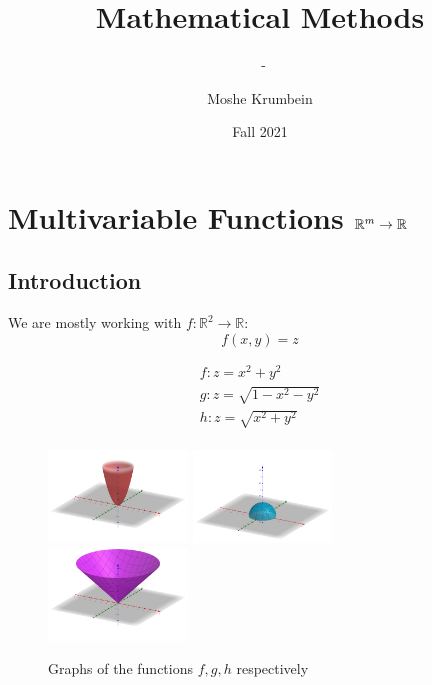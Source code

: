 \documentclass[00_complete]{subfiles}
\title{Mathematical Methods}
\author{Moshe Krumbein}
\date{Fall 2021}
\begin{document}
\setcounter{chapter}{9}

\chapter{Multivariable Functions \texorpdfstring{$\mathbb{R}^{\lowercase{m}} \to \mathbb{R}$}{Rm to R}}
\subtitle{\theauthor~- \thedate}
\section{Introduction}
We are mostly working with $f: \mathbb{R}^2 \to \mathbb{R}$:
$$f(x,y) = z$$
\begin{example}
    \begin{gather*}
     f: z=x^2+y^2 \\
     g: z=\sqrt{1-x^2-y^2} \\
     h: z=\sqrt{x^2+y^2} \\
    \end{gather*}
    \begin{figure}[ht]
    \includegraphics[width=0.33\textwidth]{w10_f}
    \includegraphics[width=0.33\textwidth]{w10_g}
    \includegraphics[width=0.33\textwidth]{w10_h}
    \caption{Graphs of the functions $f,g,h$ respectively}
    \end{figure}
    \label{cone}
\end{example}
\end{document}
